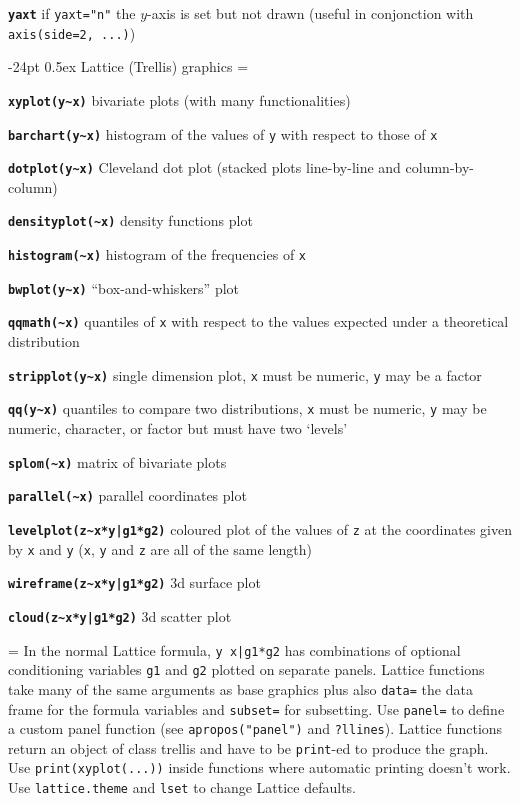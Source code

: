 \documentclass[10pt,landscape]{article}
\makeatletter
\renewcommand\section{\@startsection{section}{1}{0mm}%
                                     {-24pt}%
                                     {0.5ex}%
                                {\color{blue}\normalfont\large\bfseries}}
\newcommand{\code}{\texttt}
\newcommand{\bcode}[1]{\texttt{\textbf{#1}}}
\makeatother
\begin{document}
\begin{multicols}{3}
\bcode{yaxt}  if \code{yaxt="n"} the $y$-axis is set but not drawn (useful in conjonction with \code{axis(side=2, ...)})





\section{Lattice (Trellis) graphics}
\everypar={\hangindent=9mm}

\bcode{xyplot(y\~{}x)}  bivariate plots (with many functionalities)

\bcode{barchart(y\~{}x)}  histogram of the values of \code{y} with
respect to those of \code{x}

\bcode{dotplot(y\~{}x)}  Cleveland dot plot (stacked plots line-by-line
and column-by-column)

\bcode{densityplot(\~{}x)}  density functions plot

\bcode{histogram(\~{}x)}  histogram of the frequencies of \code{x}

\bcode{bwplot(y\~{}x)}  ``box-and-whiskers'' plot

\bcode{qqmath(\~{}x)}  quantiles of \code{x} with respect to the values expected under a theoretical distribution

\bcode{stripplot(y\~{}x)}  single dimension plot, \code{x} must be numeric, \code{y} may be a factor

\bcode{qq(y\~{}x)}  quantiles to compare two distributions, \code{x} must be numeric, \code{y} may be numeric, character, or factor but must have two `levels'

\bcode{splom(\~{}x)}  matrix of bivariate plots

\bcode{parallel(\~{}x)}  parallel coordinates plot

\bcode{levelplot(z\~{}x*y|g1*g2)}  coloured plot of the values of \code{z} at the coordinates given by \code{x} and \code{y} (\code{x}, \code{y} and \code{z} are all of the same length)

\bcode{wireframe(z\~{}x*y|g1*g2)}  3d surface plot

\bcode{cloud(z\~{}x*y|g1*g2)}  3d scatter plot

\everypar={\hangindent=0mm}
In the normal Lattice formula, \code{y~x|g1*g2} has
combinations of optional conditioning variables \code{g1}
and \code{g2} plotted on separate panels. Lattice functions 
take many of the same arguments as base
graphics plus also \code{data=} the data frame for the formula
variables and \code{subset=} for subsetting. Use \code{panel=} to
define a custom panel function (see \code{apropos("panel")}
and \code{?llines}). Lattice functions return an object of class
trellis and have to be \code{print}-ed to produce the graph. Use
\code{print(xyplot(...))} inside functions where automatic
printing doesn't work. Use \code{lattice.theme} and \code{lset} to
change Lattice defaults.



\end{multicols}
\end{document}

